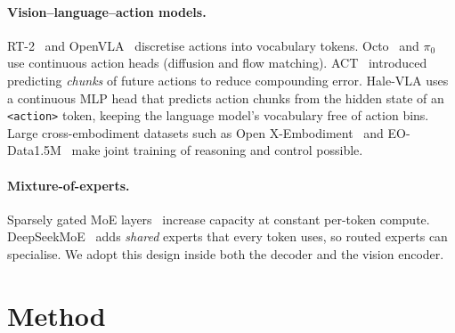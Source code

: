 \documentclass[11pt]{article}
\newcommand{\tok}[1]{\texttt{<#1>}}
\begin{document}
\paragraph{Vision--language--action models.} RT-2~\cite{brohan2023rt2} and
OpenVLA~\cite{kim2024openvla} discretise actions into vocabulary tokens. Octo~\cite{octo2024}
and $\pi_0$~\cite{black2024pi0} use continuous action heads (diffusion and flow matching).
ACT~\cite{zhao2023aloha} introduced predicting \emph{chunks} of future actions to reduce
compounding error. Hale-VLA uses a continuous MLP head that predicts action chunks from the
hidden state of an \tok{action} token, keeping the language model's vocabulary free of
action bins. Large cross-embodiment datasets such as Open X-Embodiment~\cite{oxe2023} and
EO-Data1.5M~\cite{qu2025eo1} make joint training of reasoning and control possible.

\paragraph{Mixture-of-experts.} Sparsely gated MoE layers~\cite{shazeer2017outrageously}
increase capacity at constant per-token compute. DeepSeekMoE~\cite{dai2024deepseekmoe} adds
\emph{shared} experts that every token uses, so routed experts can specialise. We adopt this
design inside both the decoder and the vision encoder.

\section{Method}
\end{document}
